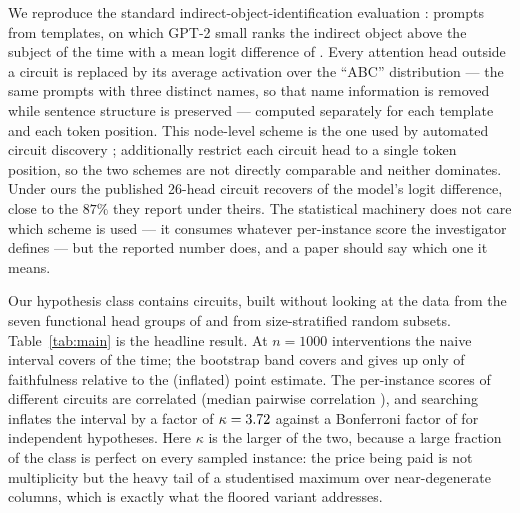 We reproduce the standard indirect-object-identification evaluation
\citep{wang2023interpretability}: \MyIOIN{} prompts from \MyIOINTemplates{}
templates, on which GPT-2 small ranks the indirect object above the subject
\MyIOIModelAcc{} of the time with a mean logit difference of \MyIOILDfull{}.
Every attention head outside a circuit is replaced by its average activation over
the ``ABC'' distribution --- the same prompts with three distinct names, so that
name information is removed while sentence structure is preserved --- computed
separately for each template and each token position. This node-level scheme is
the one used by automated circuit discovery \citep{conmy2023towards};
\citet{wang2023interpretability} additionally restrict each circuit head to a
single token position, so the two schemes are not directly comparable and neither
dominates. Under ours the published 26-head circuit recovers \MyIOIPubRatio{} of
the model's logit difference, close to the $87\%$ they report under theirs. The
statistical machinery does not care which scheme is used --- it consumes whatever
per-instance score the investigator defines --- but the reported number does, and
a paper should say which one it means.



Our hypothesis class contains \MyIOIm{} circuits, built without looking at the
data from the seven functional head groups of \citet{wang2023interpretability}
and from size-stratified random subsets. Table~\ref{tab:main} is the headline
result. At $n=1000$ interventions the naive interval covers \MyIOINaiveCov{} of
the time; the bootstrap band covers \MyIOIBootCov{} and gives up only
\MyIOIBootPenalty{} of faithfulness relative to the (inflated) point estimate.
The per-instance scores of different circuits are correlated (median pairwise
correlation \MyIOIMedCorr{}), and searching inflates the interval by a factor of
$\kappa=3.72{}$ against a Bonferroni factor of \MyIOIBonfRatio{} for
\MyIOIm{} independent hypotheses. Here $\kappa$ is the larger of the two, because
a large fraction of the class is perfect on every sampled instance: the price
being paid is not multiplicity but the heavy tail of a studentised maximum over
near-degenerate columns, which is exactly what the floored variant addresses.

